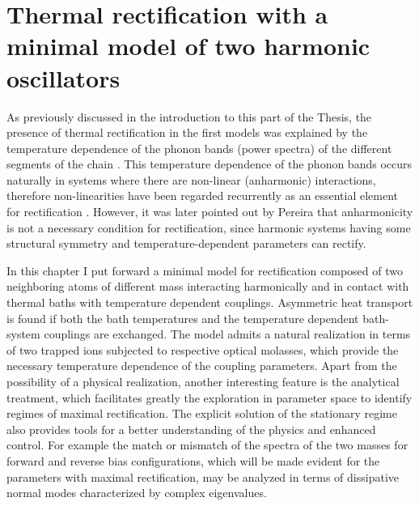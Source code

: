 
\chapter{Thermal rectification with a minimal model of two
harmonic oscillators}
\label{Chapter6}
%

As previously discussed in the introduction to this part of the Thesis, the presence of thermal rectification in the first models was explained by the temperature dependence of the phonon bands (power spectra) of the different segments of the chain \cite{Terraneo2002,Li2004}. This temperature dependence of the phonon bands occurs naturally in systems where there are non-linear (anharmonic) interactions, therefore non-linearities have been regarded recurrently as an essential element for rectification \cite{Li2012,Li2008,Hu2006,Zeng2008,Segal2005,Segal2005b,Katz2016,Benenti2016}. However, it was later pointed out by Pereira \cite{Pereira2017} that anharmonicity is not a necessary condition for rectification, since harmonic systems having some structural symmetry and temperature-dependent parameters can rectify.

In this chapter I put forward a minimal model for rectification composed of two neighboring atoms of different mass interacting harmonically and in contact with thermal baths with temperature dependent couplings. Asymmetric heat transport is found if both the bath temperatures and the temperature dependent bath-system couplings are exchanged. The model admits a natural realization in terms of two trapped ions subjected to respective optical molasses, which provide the necessary temperature dependence of the coupling parameters. Apart from the possibility of a physical realization, another interesting
feature is the analytical treatment, which facilitates greatly the exploration in parameter  space to  identify regimes of maximal rectification. The explicit solution of the stationary regime also provides tools for a better understanding of the physics and enhanced control. For example the match or mismatch of the spectra of the two masses for forward and reverse bias configurations, which will be made evident for the parameters with maximal
rectification, may be analyzed in terms of dissipative normal modes characterized by complex eigenvalues.

